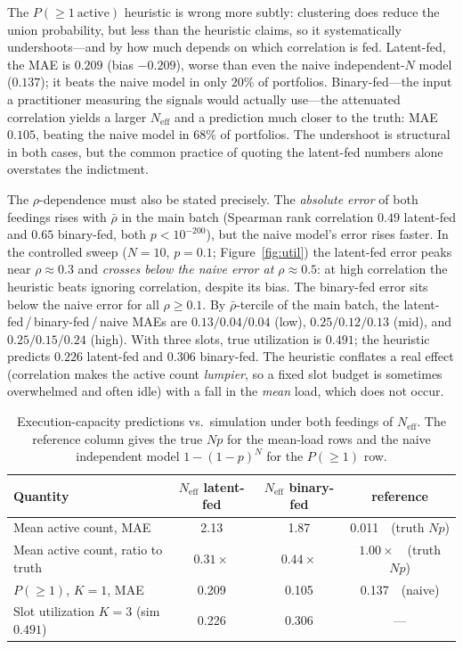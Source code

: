 \documentclass[11pt]{article}
\newcommand{\Neff}{N_{\mathrm{eff}}}
\newcommand{\rbar}{\bar{\rho}}
\begin{document}
The $P(\ge1\ \text{active})$ heuristic is wrong more subtly: clustering does
reduce the union probability, but less than the heuristic claims, so it
systematically undershoots---and by how much depends on which correlation is
fed. Latent-fed, the MAE is $0.209$ (bias $-0.209$), worse than even the naive
independent-$N$ model ($0.137$); it beats the naive model in only $20\%$ of
portfolios. Binary-fed---the input a practitioner measuring the signals would
actually use---the attenuated correlation yields a larger $\Neff$ and a
prediction much closer to the truth: MAE $0.105$, beating the naive model in
$68\%$ of portfolios. The undershoot is structural in both cases, but the
common practice of quoting the latent-fed numbers alone overstates the
indictment.

The $\rho$-dependence must also be stated precisely. The \emph{absolute error}
of both feedings rises with $\rbar$ in the main batch (Spearman rank
correlation $0.49$ latent-fed and $0.65$ binary-fed, both $p<10^{-200}$), but
the naive model's error rises faster. In the controlled sweep ($N=10$, $p=0.1$;
Figure~\ref{fig:util}) the latent-fed error peaks near $\rho\approx0.3$ and
\emph{crosses below the naive error at $\rho\approx0.5$}: at high correlation
the heuristic beats ignoring correlation, despite its bias. The binary-fed
error sits below the naive error for all $\rho\ge0.1$. By $\rbar$-tercile of
the main batch, the latent-fed\,/\,binary-fed\,/\,naive MAEs are
$0.13/0.04/0.04$ (low), $0.25/0.12/0.13$ (mid), and $0.25/0.15/0.24$ (high).
With three slots, true utilization is $0.491$; the heuristic predicts $0.226$
latent-fed and $0.306$ binary-fed. The heuristic conflates a real effect
(correlation makes the active count \emph{lumpier}, so a fixed slot budget is
sometimes overwhelmed and often idle) with a fall in the \emph{mean} load,
which does not occur.

\begin{table}[t]
\centering
\caption{Execution-capacity predictions vs.\ simulation under both feedings of
$\Neff$. The reference column gives the true $Np$ for the mean-load rows and
the naive independent model $1-(1-p)^N$ for the $P(\ge1)$ row.}
\label{tab:capacity}
\small
\begin{tabular}{lccc}
\toprule
Quantity & $\Neff$ latent-fed & $\Neff$ binary-fed & reference \\
\midrule
Mean active count, MAE                & 2.13 & 1.87 & 0.011\ \ (truth $Np$) \\
Mean active count, ratio to truth     & $0.31\times$ & $0.44\times$ & $1.00\times$\ \ (truth $Np$) \\
$P(\ge1)$, $K{=}1$, MAE               & 0.209 & 0.105 & 0.137\ \ (naive) \\
Slot utilization $K{=}3$ (sim $0.491$) & 0.226 & 0.306 & --- \\
\bottomrule
\end{tabular}
\end{table}
\end{document}

